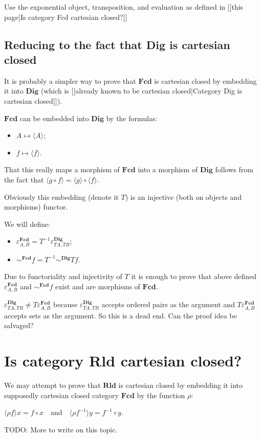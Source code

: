 Use the exponential object, transposition, and evaluation as defined in [[this page|Is category Fcd cartesian closed?]]

\subsection{Reducing to the fact that Dig is cartesian closed}
It is probably a simpler way to prove that $\mathbf{Fcd}$ is cartesian closed by embedding it into $\mathbf{Dig}$ (which is [[already known to be cartesian closed|Category Dig is cartesian closed]]).

$\mathbf{Fcd}$ can be embedded into $\mathbf{Dig}$ by the formulas:
\begin{itemize}
\item $A \mapsto \langle A \rangle$;
\item $f \mapsto \langle f \rangle$.
\end{itemize}

That this really maps a morphism of $\mathbf{Fcd}$ into a morphism of $\mathbf{Dig}$ follows from the fact that $\langle g\circ f\rangle = \langle g\rangle\circ\langle f\rangle$.

Obviously this embedding (denote it $T$) is an injective (both on objects and morphisms) functor.

We will define:
\begin{itemize}
\item $\varepsilon^{\mathbf{Fcd}}_{A, B} = T^{-1} \varepsilon^{\mathbf{Dig}}_{T A, T B}$;
\item $\sim^{\mathbf{Fcd}} f = T^{-1} \sim^{\mathbf{Dig}} T f$.
\end{itemize}

Due to functoriality and injectivity of $T$ it is enough to prove that above defined $\varepsilon^{\mathbf{Fcd}}_{A, B}$ and $\sim^{\mathbf{Fcd}} f$ exist and are morphisms of $\mathbf{Fcd}$.

$\varepsilon^{\mathbf{Dig}}_{T A, T B} \ne T\varepsilon^{\mathbf{Fcd}}_{A, B}$ because $\varepsilon^{\mathbf{Dig}}_{T A, T B}$ accepts ordered pairs as the argument and $T \varepsilon^{\mathbf{Fcd}}_{A, B}$ accepts sets as the argument. So this is a dead end. Can the proof idea be salvaged?

\section{Is category Rld cartesian closed?}

We may attempt to prove that $\mathbf{Rld}$ is cartesian closed by embedding it into supposedly cartesian closed category $\mathbf{Fcd}$ by the function $\rho$:

$\langle \rho f \rangle x = f \circ x \quad \text{and} \quad \langle \rho f^{- 1} \rangle y = f^{- 1} \circ y$.

TODO: More to write on this topic.
